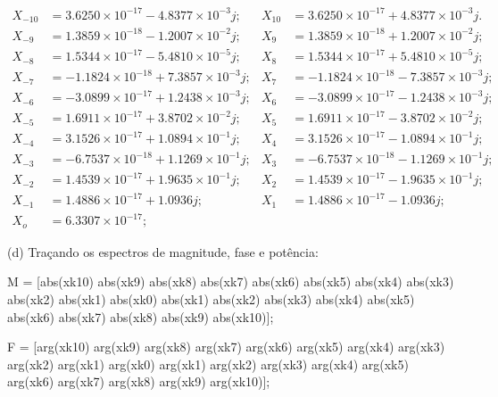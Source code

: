 \documentclass{article}
\begin{document}
\begin{align*}
    X_{-10} &=  3.6250 \times 10^{-17} - 4.8377\times 10^{-3}j; & X_{10} &=  3.6250\times 10^{-17} + 4.8377\times 10^{-3}j.\\
    X_{-9} &=  1.3859\times 10^{-18} - 1.2007\times 10^{-2}j;   & X_{9} &=  1.3859\times 10^{-18} + 1.2007\times 10^{-2}j;\\
    X_{-8} &=  1.5344\times 10^{-17} - 5.4810\times 10^{-5}j;   & X_{8} &=  1.5344\times 10^{-17} + 5.4810\times 10^{-5}j;\\
    X_{-7} &= -1.1824\times 10^{-18} + 7.3857\times 10^{-3}j;   & X_{7} &= -1.1824\times 10^{-18} - 7.3857\times 10^{-3}j;\\
    X_{-6} &= -3.0899\times 10^{-17} + 1.2438\times 10^{-3}j;   & X_{6} &= -3.0899\times 10^{-17} - 1.2438\times 10^{-3}j;\\
    X_{-5} &=  1.6911\times 10^{-17} + 3.8702\times 10^{-2}j;   & X_{5} &=  1.6911\times 10^{-17} - 3.8702\times 10^{-2}j;\\
    X_{-4} &=  3.1526\times 10^{-17} + 1.0894\times 10^{-1}j;   & X_{4} &=  3.1526\times 10^{-17} - 1.0894\times 10^{-1}j;\\
    X_{-3} &= -6.7537\times 10^{-18} + 1.1269\times 10^{-1}j;   & X_{3} &= -6.7537\times 10^{-18} - 1.1269\times 10^{-1}j;\\
    X_{-2} &=  1.4539\times 10^{-17} + 1.9635\times 10^{-1}j;   & X_{2} &=  1.4539\times 10^{-17} - 1.9635\times 10^{-1}j;\\
    X_{-1} &=  1.4886\times 10^{-17} + 1.0936j;                  & X_{1} &=  1.4886\times 10^{-17} - 1.0936j;\\
    X_{o} &= 6.3307\times 10^{-17}; &
\end{align*}

\newpage

(d) Traçando os espectros de magnitude, fase e potência:

\vspace{\baselineskip}

M = [abs(xk10) abs(xk9) abs(xk8) abs(xk7) abs(xk6) abs(xk5) abs(xk4) abs(xk3) abs(xk2) abs(xk1) abs(xk0) abs(xk1) abs(xk2) abs(xk3) abs(xk4) abs(xk5) abs(xk6) abs(xk7) abs(xk8) abs(xk9) abs(xk10)];

\vspace{\baselineskip}

F = [arg(xk10) arg(xk9) arg(xk8) arg(xk7) arg(xk6) arg(xk5) arg(xk4) arg(xk3) arg(xk2) arg(xk1) arg(xk0) arg(xk1) arg(xk2) arg(xk3) arg(xk4) arg(xk5) arg(xk6) arg(xk7) arg(xk8) arg(xk9) arg(xk10)];
\end{document}
